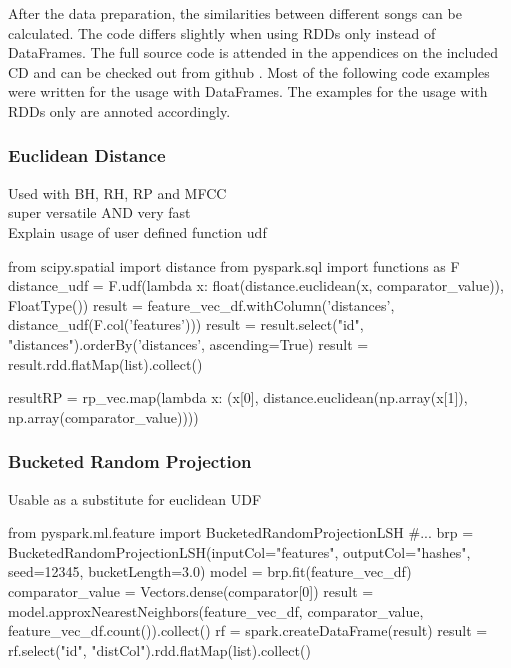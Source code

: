 After the data preparation, the similarities between different songs can be calculated. The code differs slightly when using RDDs only instead of DataFrames. The full source code is attended in the appendices on the included CD and can be checked out from github \cite{github-code}. Most of the following code examples were written for the usage with DataFrames. The examples for the usage with RDDs only are annoted accordingly.\\

\subsubsection{Euclidean Distance}

\noindent Used with BH, RH, RP and MFCC\\super versatile AND very fast\\
Explain usage of user defined function udf\\

\begin{pythonCode}[frame=single,label={lst:eucd},caption={euclidean distance DF},captionpos=b]
from scipy.spatial import distance
from pyspark.sql import functions as F
distance_udf = F.udf(lambda x: float(distance.euclidean(x, comparator_value)), FloatType())
result = feature_vec_df.withColumn('distances', distance_udf(F.col('features')))
result = result.select("id", "distances").orderBy('distances', ascending=True)
result = result.rdd.flatMap(list).collect()
\end{pythonCode}

\begin{pythonCode}[frame=single,label={lst:eucr},caption={euclidean distance RDD},captionpos=b]
resultRP = rp_vec.map(lambda x: (x[0], distance.euclidean(np.array(x[1]), np.array(comparator_value))))
\end{pythonCode}

\subsubsection{Bucketed Random Projection}

Usable as a substitute for euclidean UDF\\

\begin{pythonCode}[frame=single,label={lst:brp},caption={bucketed random projection},captionpos=b]
from pyspark.ml.feature import BucketedRandomProjectionLSH
#...
brp = BucketedRandomProjectionLSH(inputCol="features", outputCol="hashes", seed=12345, bucketLength=3.0)
model = brp.fit(feature_vec_df)
comparator_value = Vectors.dense(comparator[0])
result = model.approxNearestNeighbors(feature_vec_df, comparator_value, feature_vec_df.count()).collect()
rf = spark.createDataFrame(result)
result = rf.select("id", "distCol").rdd.flatMap(list).collect()
\end{pythonCode}

